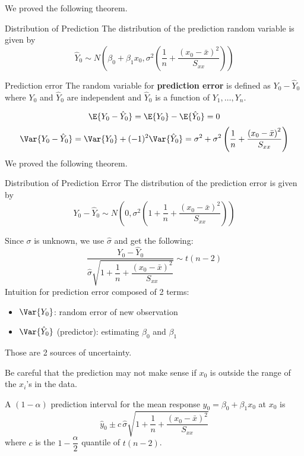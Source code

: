 We proved the following theorem.
\begin{Theorem}{Distribution of Prediction}{}
    The distribution of the prediction random variable is given by
    \[ \hat{Y}_0 \sim N\left( \beta_0+\beta_1x_0,
        \sigma^2\left( \frac{1}{n} +\frac{\left( x_0-\bar{x} \right)^2}{S_{xx}}  \right) \right) \]
\end{Theorem}
\begin{Definition}{Prediction error}{}
    The random variable for \textbf{prediction error} is defined as
    $ Y_0-\hat{Y}_0 $
    where $ Y_0 $ and $ \hat{Y}_0 $ are independent
    and $ \hat{Y}_0 $ is a function of $ Y_1,\ldots,Y_n $.
\end{Definition}
\[ \E{Y_0-\hat{Y}_0}=\E{Y_0}-\E{\hat{Y}_0}=0 \]
\[ \Var{Y_0-\hat{Y}_0}=\Var{Y_0}+(-1)^2\Var{\hat{Y}_0}
    =\sigma^2+\sigma^2\left( \frac{1}{n} +\frac{\left( x_0-\bar{x} \right)^2}{S_{xx}} \right)
\]
We proved the following theorem.
\begin{Theorem}{Distribution of Prediction Error}{}
    The distribution of the prediction error is given by
    \[ Y_0-\hat{Y}_0
        \sim N\left( 0,\sigma^2\left( 1+\frac{1}{n}+\frac{\left( x_0-\bar{x} \right)^2}{S_{xx}}  \right) \right) \]
\end{Theorem}
Since $ \sigma $ is unknown, we use $ \hat{\sigma} $ and get the following:
\[ \frac{Y_0-\hat{Y}_0}{
        \hat{\sigma}\sqrt{1+\dfrac{1}{n}+\dfrac{(x_0-\bar{x})^2}{S_{xx}}}
    } \sim t(n-2) \]
Intuition for prediction error composed of 2 terms:
\begin{itemize}
    \item $ \Var{Y_0} $: random error of new observation
    \item $ \Var{\hat{Y}_0} $ (predictor): estimating $ \beta_0 $ and $ \beta_1 $
\end{itemize}
Those are 2 sources of uncertainty.

\begin{Remark}{}{}
    Be careful that the prediction may not make sense if
    $ x_0 $ is outside the range of the $ x_i $'s in the data.
\end{Remark}

A $ (1-\alpha) $ prediction interval for the mean response $ y_0=\beta_0+\beta_1x_0 $
at $ x_0 $
is
\[ \hat{y}_0\pm c\, \hat{\sigma}\sqrt{1+\dfrac{1}{n}+\dfrac{(x_0-\bar{x})^2}{S_{xx}}}
\]
where $ c $ is the $ 1-\dfrac{\alpha}{2} $ quantile of $ t(n-2) $.

